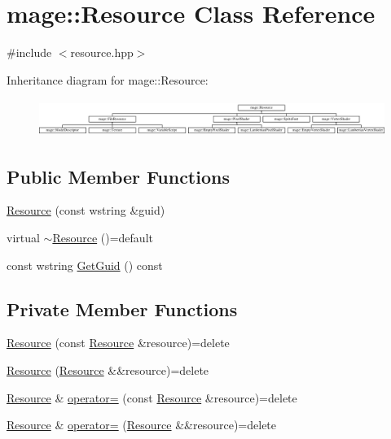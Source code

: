 \hypertarget{classmage_1_1_resource}{}\section{mage\+:\+:Resource Class Reference}
\label{classmage_1_1_resource}


{\ttfamily \#include $<$resource.\+hpp$>$}

Inheritance diagram for mage\+:\+:Resource\+:\begin{figure}[H]
\begin{center}
\leavevmode
\includegraphics[height=1.224490cm]{classmage_1_1_resource}
\end{center}
\end{figure}
\subsection*{Public Member Functions}
\begin{DoxyCompactItemize}
\item 
\hyperlink{classmage_1_1_resource_a3e2540455d88e1825a680fb4e7fe25c4}{Resource} (const wstring \&guid)
\item 
virtual \hyperlink{classmage_1_1_resource_a26cea6261aac321d95ac745703f1a3e8}{$\sim$\+Resource} ()=default
\item 
const wstring \hyperlink{classmage_1_1_resource_a62d9dc4728df43a66036f4aff30828ff}{Get\+Guid} () const
\end{DoxyCompactItemize}
\subsection*{Private Member Functions}
\begin{DoxyCompactItemize}
\item 
\hyperlink{classmage_1_1_resource_a4ee2dba2675546b603e03a69a2f2db52}{Resource} (const \hyperlink{classmage_1_1_resource}{Resource} \&resource)=delete
\item 
\hyperlink{classmage_1_1_resource_af524c27c4a8e949af7c1145c56b773d0}{Resource} (\hyperlink{classmage_1_1_resource}{Resource} \&\&resource)=delete
\item 
\hyperlink{classmage_1_1_resource}{Resource} \& \hyperlink{classmage_1_1_resource_ad8fa57f37eb253b90d18d33383b12875}{operator=} (const \hyperlink{classmage_1_1_resource}{Resource} \&resource)=delete
\item 
\hyperlink{classmage_1_1_resource}{Resource} \& \hyperlink{classmage_1_1_resource_a5d087980bb8fb1cd7d96c22d9e0eb519}{operator=} (\hyperlink{classmage_1_1_resource}{Resource} \&\&resource)=delete
\end{DoxyCompactItemize}
